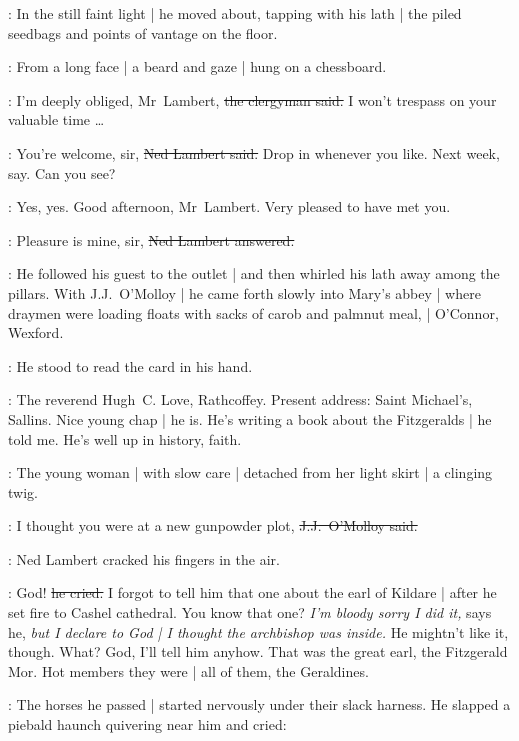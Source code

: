 :
In the still faint light |
he moved about,
tapping with his lath |
the piled seedbags and points of vantage on the floor.

\begin{interject}
    :
    From a long face |
    a beard and gaze |
    hung on a chessboard.
\end{interject}

\revlove:
I'm deeply obliged, Mr~Lambert,
\sout{the clergyman said.}
I won't trespass on your valuable time \ldots

\lambert:
You're welcome, sir,
\sout{Ned Lambert said.}
Drop in whenever you like.
Next week, say.
Can you see?

\revlove:
Yes, yes.%
Good afternoon, Mr~Lambert.
Very pleased to have met you.

\lambert:
Pleasure is mine, sir,
\sout{Ned Lambert answered.}

:
He followed his guest to the outlet |
and then whirled his lath away among the pillars.
With J.J.~O'Molloy |
he came forth slowly into Mary's abbey |
where draymen were loading floats
with sacks of carob and palmnut meal, |
O'Connor, Wexford.

:
He stood to read the card in his hand.

\lambert:
The reverend Hugh~C. Love, Rathcoffey.
Present address:
Saint Michael's, Sallins.
Nice young chap |
he is.
He's writing a book about the Fitzgeralds |
he told me.
He's well up in history, faith.

\begin{interject}
    :
    The young woman |
    with slow care |
    detached from her light skirt |
    a clinging twig.
\end{interject}%

\jjom:
I thought you were at a new gunpowder plot,
\sout{J.J.~O'Molloy said.}

:
Ned Lambert cracked his fingers in the air.

\lambert:
God!
\sout{he cried.}
I forgot to tell him that one about the earl of Kildare |
after he set fire to Cashel cathedral.
You know that one?
\emph{I'm bloody sorry I did it,}
says he,
\emph{but I declare to God |
I thought the archbishop was inside.}
He mightn't like it, though.
What?
God, I'll tell him anyhow.
That was the great earl, the Fitzgerald Mor.
Hot members they were |
all of them, the Geraldines.

:
The horses he passed |
started nervously%
under their slack harness.
He slapped a piebald haunch quivering near him and cried:

